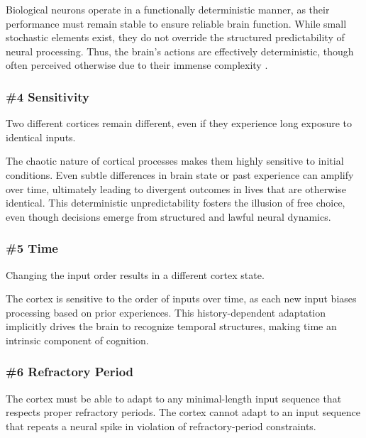 \documentclass{article}
\newenvironment{one_assertion}[1]
{
  \begin{tabular}{p{1.5cm}p{8.2cm}}
    \textbf{Assertion:} & #1 \\
}{
  \end{tabular}\\
}
\newenvironment{two_assertions}[2]
{
  \begin{tabular}{p{1.5cm}p{8.2cm}}
    \textbf{Assertion:} & #1 \\
    \textbf{Assertion:} & #2 \\
}{
  \end{tabular}\\
}
\begin{document}
Biological neurons operate in a functionally deterministic manner, as their performance must remain stable to ensure reliable brain function. While small stochastic elements exist, they do not override the structured predictability of neural processing. Thus, the brain's actions are effectively deterministic, though often perceived otherwise due to their immense complexity \cite{AtlanticFreeWill}.

\subsubsection*{\#4 Sensitivity}
\begin{one_assertion}
    {Two different cortices remain different, even if they experience long exposure to identical inputs.}
\end{one_assertion}

The chaotic nature of cortical processes makes them highly sensitive to initial conditions. Even subtle differences in brain state or past experience can amplify over time, ultimately leading to divergent outcomes in lives that are otherwise identical. This deterministic unpredictability fosters the illusion of free choice, even though decisions emerge from structured and lawful neural dynamics.

\subsubsection*{\#5 Time}
\begin{one_assertion}
    {Changing the input order results in a different cortex state.}
\end{one_assertion}

The cortex is sensitive to the order of inputs over time, as each new input biases processing based on prior experiences. This history-dependent adaptation implicitly drives the brain to recognize temporal structures, making time an intrinsic component of cognition.


\subsubsection*{\#6 Refractory Period}
\begin{two_assertions}
    {The cortex must be able to adapt to any minimal-length input sequence that respects proper refractory periods.}
    {The cortex cannot adapt to an input sequence that repeats a neural spike in violation of refractory-period constraints.}
\end{two_assertions}
\end{document}
